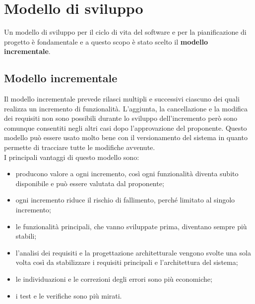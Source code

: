 \section{Modello di sviluppo}
Un modello di sviluppo per il ciclo di vita del software e per la pianificazione di progetto è fondamentale e a questo scopo è stato scelto il \textbf{modello incrementale}.

\subsection{Modello incrementale}
Il modello incrementale prevede rilasci multipli e successivi ciascuno dei quali realizza un incremento di funzionalità.
L'aggiunta, la cancellazione e la modifica dei requisiti non sono possibili durante lo sviluppo dell'incremento però sono comunque consentiti negli altri casi dopo l'approvazione del proponente.
Questo modello può essere usato molto bene con il versionamento del sistema in quanto permette di tracciare tutte le modifiche avvenute.\\
I principali vantaggi di questo modello sono:
\begin{itemize}
	\item producono valore a ogni incremento, così ogni funzionalità diventa subito disponibile e può essere valutata dal proponente;\\
	\item ogni incremento riduce il rischio di fallimento, perché limitato al singolo incremento;\\
	\item le funzionalità principali, che vanno sviluppate prima, diventano sempre più stabili;\\
	\item l'analisi dei requisiti e la progettazione architetturale vengono svolte una sola volta così da stabilizzare i requisiti principali e l'architettura del sistema;\\
	\item le individuazioni e le correzioni degli errori sono più economiche; \\
	\item i test e le verifiche sono più mirati. \\
\end{itemize}
